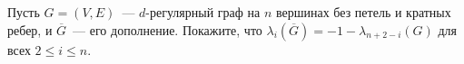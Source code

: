 Пусть $G = (V, E)$~--- $d$-регулярный граф на $n$ вершинах без петель и кратных ребер, и $\overline{G}$~--- его
дополнение. Покажите, что $\lambda_i(\overline{G}) = -1 - \lambda_{n + 2 - i}(G)$ для всех $2 \le i \le n$.